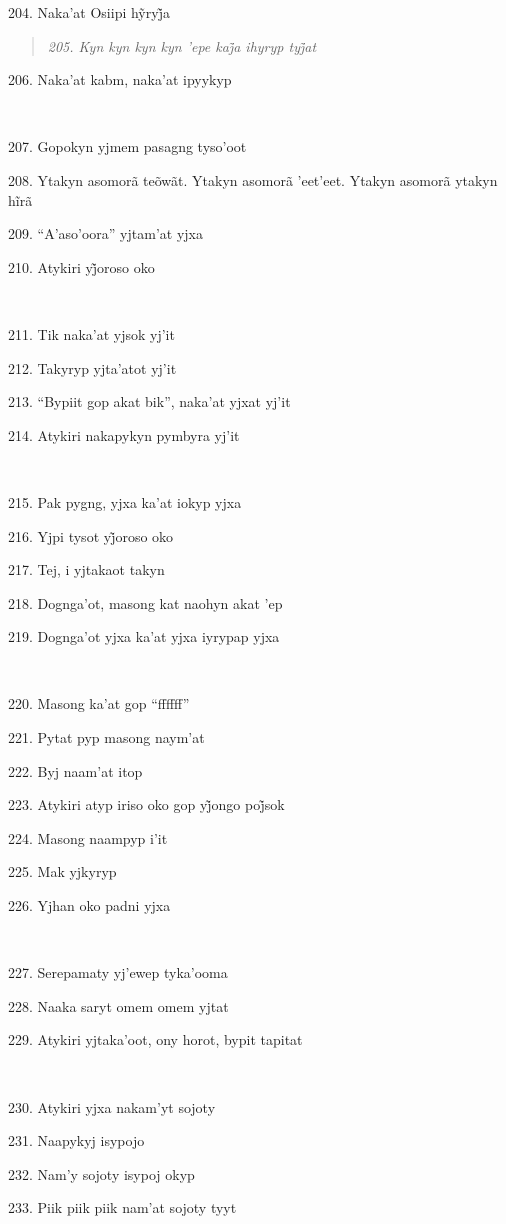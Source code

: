 204. Naka’at Osiipi hỹryj̃a

\begin{quote}
\forceindent\emph{205. Kyn kyn kyn kyn ’epe kaj̃a ihyryp tyj̃at}
\end{quote}

206. Naka'at kabm, naka'at ipyykyp

~

207. Gopokyn yjmem pasagng tyso'oot

208. Ytakyn asomorã teõwãt. Ytakyn asomorã ’eet’eet. Ytakyn asomorã ytakyn hĩrã

209. ``A'aso'oora'' yjtam'at yjxa

210. Atykiri yj̃oroso oko

~

211. Tik naka'at yjsok yj'it

212. Takyryp yjta'atot yj'it

213. ``Bypiit gop akat bik'', naka'at yjxat yj'it

214. Atykiri nakapykyn pymbyra yj'it

~

215. Pak pygng, yjxa ka'at iokyp yjxa

216. Yjpi tysot yj̃oroso oko

217. Tej, i yjtakaot takyn

218. Dognga'ot, masong kat naohyn akat 'ep

219. Dognga'ot yjxa ka'at yjxa iyrypap yjxa

~

220. Masong ka'at gop ``ffffff''

221. Pytat pyp masong naym'at

222. Byj naam'at itop

223. Atykiri atyp iriso oko gop yj̃ongo poj̃sok

224. Masong naampyp i'it

225. Mak yjkyryp

226. Yjhan oko padni yjxa

~

227. Serepamaty yj'ewep tyka'ooma

228. Naaka saryt omem omem yjtat

229. Atykiri yjtaka'oot, ony horot, bypit tapitat

~

230. Atykiri yjxa nakam'yt sojoty

231. Naapykyj isypojo

232. Nam'y sojoty isypoj okyp

233. Piik piik piik nam'at sojoty tyyt

